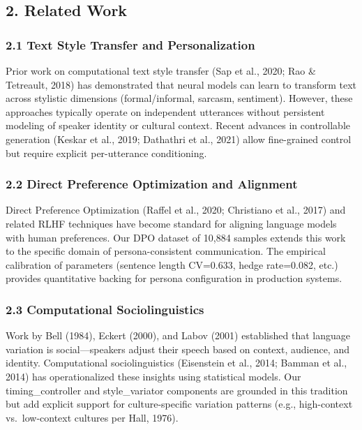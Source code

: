 \documentclass[
]{article}
\begin{document}
\hypertarget{related-work}{%
\subsection{2. Related Work}\label{related-work}}

\hypertarget{text-style-transfer-and-personalization}{%
\subsubsection{2.1 Text Style Transfer and
Personalization}\label{text-style-transfer-and-personalization}}

Prior work on computational text style transfer (Sap et al., 2020; Rao
\& Tetreault, 2018) has demonstrated that neural models can learn to
transform text across stylistic dimensions (formal/informal, sarcasm,
sentiment). However, these approaches typically operate on independent
utterances without persistent modeling of speaker identity or cultural
context. Recent advances in controllable generation (Keskar et al.,
2019; Dathathri et al., 2021) allow fine-grained control but require
explicit per-utterance conditioning.

\hypertarget{direct-preference-optimization-and-alignment}{%
\subsubsection{2.2 Direct Preference Optimization and
Alignment}\label{direct-preference-optimization-and-alignment}}

Direct Preference Optimization (Raffel et al., 2020; Christiano et al.,
2017) and related RLHF techniques have become standard for aligning
language models with human preferences. Our DPO dataset of 10,884
samples extends this work to the specific domain of persona-consistent
communication. The empirical calibration of parameters (sentence length
CV=0.633, hedge rate=0.082, etc.) provides quantitative backing for
persona configuration in production systems.

\hypertarget{computational-sociolinguistics}{%
\subsubsection{2.3 Computational
Sociolinguistics}\label{computational-sociolinguistics}}

Work by Bell (1984), Eckert (2000), and Labov (2001) established that
language variation is social---speakers adjust their speech based on
context, audience, and identity. Computational sociolinguistics
(Eisenstein et al., 2014; Bamman et al., 2014) has operationalized these
insights using statistical models. Our timing\_controller and
style\_variator components are grounded in this tradition but add
explicit support for culture-specific variation patterns (e.g.,
high-context vs.~low-context cultures per Hall, 1976).
\end{document}
